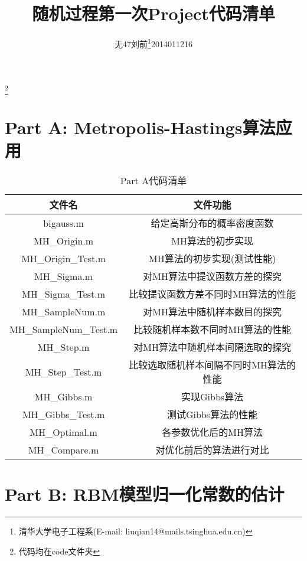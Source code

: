 \documentclass[11pt]{article}
\begin{document}
\title{随机过程第一次Project代码清单}\footnote{代码均在code文件夹}
\author{无47\hspace{2em}刘前\thanks{清华大学电子工程系(E-mail: liuqian14@mails.tsinghua.edu.cn)}\hspace{2em}2014011216\hspace{2em}}
\maketitle

\section{Part A: Metropolis-Hastings算法应用}
\begin{table}[!htbp]
  \centering  
  \begin{tabular}{c|c} 
  \hline\hline
  文件名 & 文件功能\\ \hline
  bigauss.m& 给定高斯分布的概率密度函数 \\ \hline
  MH\_Origin.m & MH算法的初步实现 \\
  MH\_Origin\_Test.m & MH算法的初步实现(测试性能) \\ \hline
  MH\_Sigma.m & 对MH算法中提议函数方差的探究 \\
  MH\_Sigma\_Test.m &  比较提议函数方差不同时MH算法的性能\\ \hline
  MH\_SampleNum.m & 对MH算法中随机样本数目的探究 \\
  MH\_SampleNum\_Test.m &  比较随机样本数不同时MH算法的性能\\ \hline
  MH\_Step.m & 对MH算法中随机样本间隔选取的探究 \\
  MH\_Step\_Test.m &  比较选取随机样本间隔不同时MH算法的性能\\ \hline
  MH\_Gibbs.m &  实现Gibbs算法 \\ 
  MH\_Gibbs\_Test.m &  测试Gibbs算法的性能 \\\hline
  MH\_Optimal.m & 各参数优化后的MH算法 \\
  MH\_Compare.m & 对优化前后的算法进行对比\\ \hline\hline
\end{tabular}
\caption{Part A代码清单}
\label{CodeList1}
\end{table}


\section{Part B: RBM模型归一化常数的估计}
\end{document}
